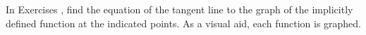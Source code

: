 {\noindent In Exercises}
{, find the equation of the tangent line to  the graph of the  implicitly defined function at the indicated points. As a visual aid, each function is graphed.
}
